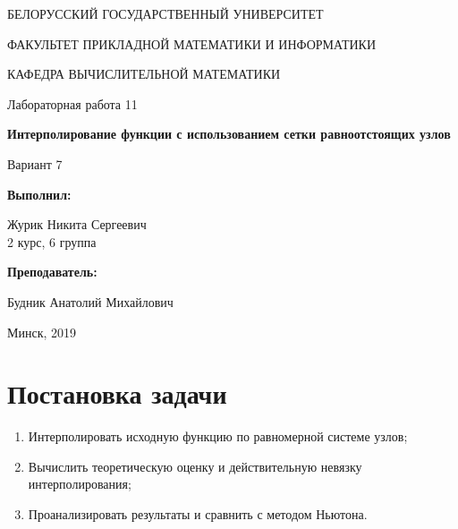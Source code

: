 \documentclass[14pt, a4paper]{article}
\begin{document}
\begin{titlepage}
\begin{center}
\large{БЕЛОРУССКИЙ ГОСУДАРСТВЕННЫЙ УНИВЕРСИТЕТ 

ФАКУЛЬТЕТ ПРИКЛАДНОЙ МАТЕМАТИКИ И ИНФОРМАТИКИ

КАФЕДРА ВЫЧИСЛИТЕЛЬНОЙ МАТЕМАТИКИ}
\end{center}
\vspace*{\fill}
\begin{center}
Лабораторная работа 11

\large{\textbf{Интерполирование функции с использованием сетки равноотстоящих узлов}}

Вариант 7
\end{center}
\begin{flushright}
\textbf{Выполнил:}

Журик Никита Сергеевич \\ 2 курс, 6 группа

\textbf{Преподаватель:}

Будник Анатолий Михайлович
\end{flushright}
\vspace*{\fill}
\begin{center}
Минск, 2019
\end{center}
\end{titlepage}

\tableofcontents
\newpage

\newpage
{}

  \section{Постановка задачи}
    \begin{enumerate}
      \item
      Интерполировать исходную функцию по равномерной системе узлов;
      \item
      Вычислить теоретическую оценку и действительную невязку интерполирования;
      \item
      Проанализировать результаты и сравнить с методом Ньютона.
    \end{enumerate}
\end{document}
